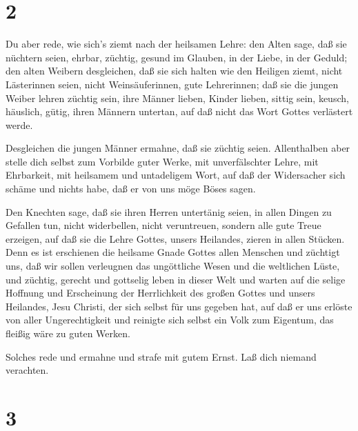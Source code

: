 \hypertarget{section-1}{%
\section{2}\label{section-1}}

 Du aber rede, wie sich's ziemt nach der heilsamen Lehre:
 den Alten sage, daß sie nüchtern seien, ehrbar, züchtig,
gesund im Glauben, in der Liebe, in der Geduld;  den alten
Weibern desgleichen, daß sie sich halten wie den Heiligen ziemt, nicht
Lästerinnen seien, nicht Weinsäuferinnen, gute Lehrerinnen; 
daß sie die jungen Weiber lehren züchtig sein, ihre Männer lieben,
Kinder lieben,  sittig sein, keusch, häuslich, gütig, ihren
Männern untertan, auf daß nicht das Wort Gottes verlästert werde.

 Desgleichen die jungen Männer ermahne, daß sie züchtig
seien.  Allenthalben aber stelle dich selbst zum Vorbilde
guter Werke, mit unverfälschter Lehre, mit Ehrbarkeit,  mit
heilsamem und untadeligem Wort, auf daß der Widersacher sich schäme und
nichts habe, daß er von uns möge Böses sagen.

 Den Knechten sage, daß sie ihren Herren untertänig seien,
in allen Dingen zu Gefallen tun, nicht widerbellen,  nicht
veruntreuen, sondern alle gute Treue erzeigen, auf daß sie die Lehre
Gottes, unsers Heilandes, zieren in allen Stücken.  Denn es
ist erschienen die heilsame Gnade Gottes allen Menschen 
und züchtigt uns, daß wir sollen verleugnen das ungöttliche Wesen und
die weltlichen Lüste, und züchtig, gerecht und gottselig leben in dieser
Welt  und warten auf die selige Hoffnung und Erscheinung
der Herrlichkeit des großen Gottes und unsers Heilandes, Jesu Christi,
 der sich selbst für uns gegeben hat, auf daß er uns
erlöste von aller Ungerechtigkeit und reinigte sich selbst ein Volk zum
Eigentum, das fleißig wäre zu guten Werken.

 Solches rede und ermahne und strafe mit gutem Ernst. Laß
dich niemand verachten.

\hypertarget{section-2}{%
\section{3}\label{section-2}}


